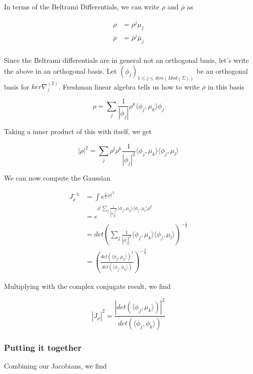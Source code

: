     In terms of the Beltrami Differentials, we can write $\rho$ and $\bar \rho$ as

    \begin{align}
        \rho & = \rho^j \mu_j\\
        \bar \rho & = \bar \rho^j \bar \mu_j\\
    \end{align}

    Since the Beltrami differentials are in general not an orthogonal basis, let's write the above in an orthogonal basis. Let $(\phi_j)_{1 \le j \le dim(Mod(\Sigma))}$ be an orthogonal basis for $ker \nabla^{(2)}_{\bar z}$. Freshman linear algebra tells us how to write $\rho$ in this basis

    \begin{equation}
        \rho = \sum_j  \frac 1 {|\phi_j|} \rho^k \langle \phi_j , \mu_k \rangle \phi_j
    \end{equation}

    Taking a inner product of this with itself, we get

    \begin{equation}
        |\rho|^2 = \sum_j  \rho^l \rho^k \frac 1 {|\phi_j|^2} \langle \phi_j , \mu_k \rangle \langle \phi_j , \mu_l \rangle
    \end{equation}

    We can now compute the Gaussian

    \begin{align}
        J_\rho^{-1} &= \int e^{\frac12 |\rho|^2} \\
            &= e^{\rho^l \sum_j \frac 1 {|\phi_j|^2} \langle \phi_j , \mu_k \rangle \langle \phi_j , \mu_l \rangle \rho^k }\\
            &= det\left(\sum_j \frac 1 {|\phi_j|^2} \langle \phi_j , \mu_k \rangle \langle \phi_j , \mu_l \rangle \right)^{-\frac12}\\
            &= \left(\frac {det(\langle \phi_j , \mu_k \rangle)^2} {det(\langle \phi_j, \phi_k \rangle)} \right)^{-\frac12}
    \end{align}

    Multiplying with the complex conjugate result, we find

    \begin{equation}
        |J_\rho|^2 = \frac { | det(\langle \phi_j , \mu_k \rangle) | ^2} {det(\langle \phi_j, \phi_k \rangle)}
    \end{equation}

\subsubsection{Putting it together}
    Combining our Jacobians, we find

